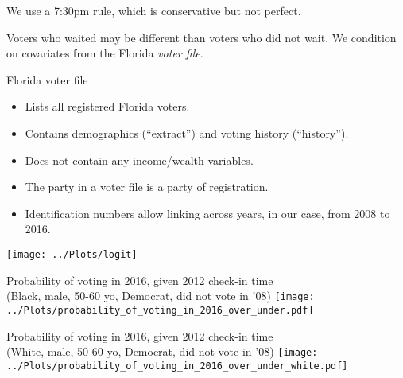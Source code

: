 \documentclass{beamer}
\begin{document}
		\begin{frame}
                  We use a 7:30pm rule, which is conservative but not perfect.
		\end{frame}

		\begin{frame}
                  Voters who waited may be different than voters who
                  did not wait.  We condition on covariates from the
                  Florida \emph{voter file}.
		\end{frame}

		\begin{frame}
                  Florida voter file
                  \begin{itemize}
                    \item <2-> Lists all registered Florida voters.
                    \item <3-> Contains demographics (``extract'') and
                      voting history (``history'').
                    \item <4-> Does not contain any income/wealth
                      variables.
                    \item <5-> The party in a voter file is a party of
                      registration.
                    \item <6-> Identification numbers allow linking
                      across years, in our case, from 2008 to 2016.
                    \end{itemize}
                  \end{frame}


	
		\begin{frame}
		\centering 
		\texttt{[image: ../Plots/logit]}			
		\end{frame}

		\begin{frame}				
			\centering
			Probability of voting in 2016, given 2012 check-in time \\
			(Black, male, 50-60 yo, Democrat, did not vote in '08)
			\texttt{[image: ../Plots/probability\_of\_voting\_in\_2016\_over\_under.pdf]}
		\end{frame}
		
		
		\begin{frame}				
                  \centering
			Probability of voting in 2016, given 2012 check-in time \\
			(White, male, 50-60 yo, Democrat, did not vote in '08)
			\texttt{[image: ../Plots/probability\_of\_voting\_in\_2016\_over\_under\_white.pdf]}
                      \end{frame}
                
\end{document}
